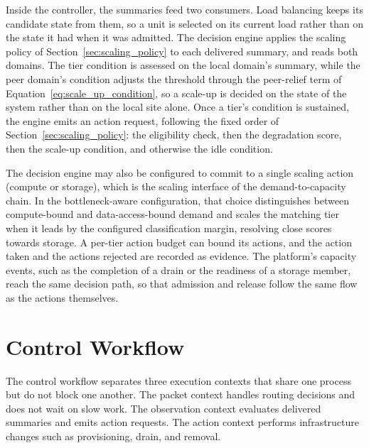 ﻿\documentclass[12pt,reqno,twoside]{amsbook}
\begin{document}
Inside the controller, the summaries feed two consumers. Load balancing keeps
its candidate state from them, so a unit is selected on its current load
rather than on the state it had when it was admitted. The decision engine
applies the scaling policy of Section~\ref{sec:scaling_policy} to each
delivered summary, and reads both domains. The tier condition is assessed on
the local domain's summary, while the peer domain's condition adjusts the
threshold through the peer-relief term of
Equation~\eqref{eq:scale_up_condition}, so a scale-up is decided on the state
of the system rather than on the local site alone. Once a tier's condition is
sustained, the engine emits an action request, following the fixed order of
Section~\ref{sec:scaling_policy}: the eligibility check, then the degradation
score, then the scale-up condition, and otherwise the idle condition.

The decision engine may also be configured to commit to a single scaling 
action (compute or storage), which is the scaling interface of the demand-to-capacity chain. 
In the bottleneck-aware configuration, that choice distinguishes between compute-bound and
data-access-bound demand and scales the matching tier when it leads by the
configured classification margin, resolving close scores towards storage. 
A per-tier action budget can bound its actions,
and the action taken and the actions rejected are recorded as evidence. The
platform's capacity events, such as the completion of a drain or the
readiness of a storage member, reach the same decision path, so that
admission and release follow the same flow as the actions themselves.

\section{Control Workflow}\label{sec:control_workflow}
The control workflow separates three execution contexts that share one
process but do not block one another. The packet context handles routing
decisions and does not wait on slow work. The observation context evaluates
delivered summaries and emits action requests. The action context performs
infrastructure changes such as provisioning, drain, and removal.
\end{document}
